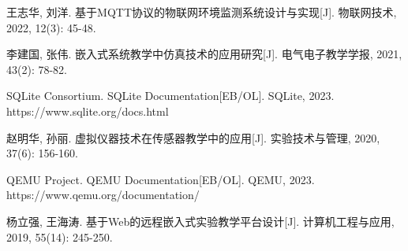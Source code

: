 \documentclass[12pt,a4paper]{ctexart}
\begin{document}
\begin{enumerate}[label={[\arabic*]},leftmargin=2em,itemsep=0.3em]
    \item 王志华, 刘洋. 基于MQTT协议的物联网环境监测系统设计与实现[J]. 物联网技术, 2022, 12(3): 45-48.
    
    \item 李建国, 张伟. 嵌入式系统教学中仿真技术的应用研究[J]. 电气电子教学学报, 2021, 43(2): 78-82.
    
    \item SQLite Consortium. SQLite Documentation[EB/OL]. SQLite, 2023. https://www.sqlite.org/docs.html
    
    \item 赵明华, 孙丽. 虚拟仪器技术在传感器教学中的应用[J]. 实验技术与管理, 2020, 37(6): 156-160.
    
    \item QEMU Project. QEMU Documentation[EB/OL]. QEMU, 2023. https://www.qemu.org/documentation/
    
    \item 杨立强, 王海涛. 基于Web的远程嵌入式实验教学平台设计[J]. 计算机工程与应用, 2019, 55(14): 245-250.
\end{enumerate}
\end{document}
